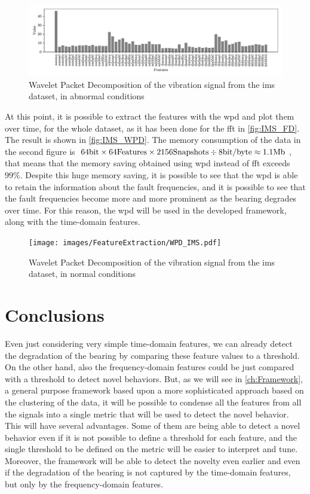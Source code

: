 \begin{figure}
    \centering
    \includegraphics[width=\textwidth]{images/FeatureExtraction/IMS_WPD_fault.pdf}
    \caption{Wavelet Packet Decomposition of the  vibration signal from the \gls{ims} dataset, in abnormal conditions}
    \label{fig:IMS_WPD_fault}
\end{figure}

At this point, it is possible to extract the features with the \gls{wpd} and plot them over time, for the whole dataset, as it has been done for the \gls{fft} in \autoref{fig:IMS_FD}. The result is shown in \autoref{fig:IMS_WPD}. The memory consumption of the data in the second figure is $64 \si{\bit} \times 64 \text{Features} \times 2156 \text{Snapshots} \div 8 \text{bit/byte} \approx 1.1 \text{Mb}$, that means that the memory saving obtained using \gls{wpd} instead of \gls{fft} exceeds $99\%$. 
Despite this huge memory saving, it is possible to see that the \gls{wpd} is able to retain the information about the fault frequencies, and it is possible to see that the fault frequencies become more and more prominent as the bearing degrades over time. For this reason, the \gls{wpd} will be used in the developed framework, along with the time-domain features.

\begin{figure}
    \centering
    \texttt{[image: images/FeatureExtraction/WPD\_IMS.pdf]}
    \caption{Wavelet Packet Decomposition of the  vibration signal from the \gls{ims} dataset, in normal conditions}
    \label{fig:IMS_WPD}
\end{figure}

\section{Conclusions}
Even just considering very simple time-domain features, we can already detect the degradation of the bearing by comparing these feature values to a threshold. On the other hand, also the frequency-domain features could be just compared with a threshold to detect novel behaviors. But, as we will see in \autoref{ch:Framework}, a general purpose framework based upon a more sophisticated approach based on the clustering of the data, it will be possible to condense all the features from all the signals into a single metric that will be used to detect the novel behavior. This will have several advantages. Some of them are being able to detect a novel behavior even if it is not possible to define a threshold for each feature, and the single threshold to be defined on the metric will be easier to interpret and tune. Moreover, the framework will be able to detect the novelty even earlier and even if the degradation of the bearing is not captured by the time-domain features, but only by the frequency-domain features.

